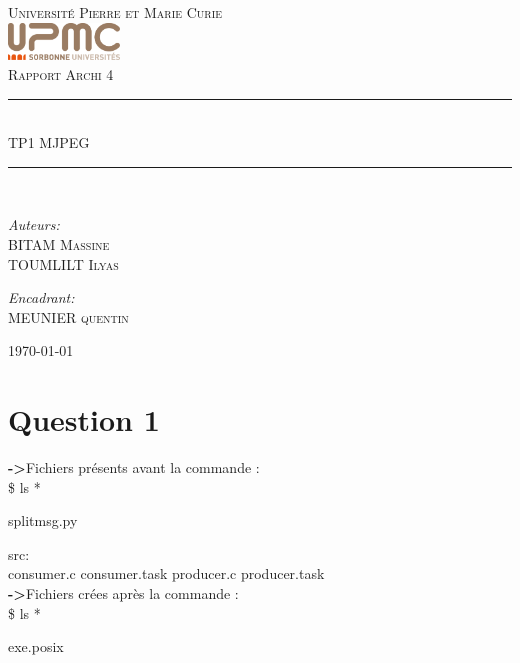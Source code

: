 \documentclass[12pt]{article}
\newcommand{\HRule}{\rule{\linewidth}{0.5mm}}
\begin{document}
\begin{titlepage}
  \begin{center}
    \textsc{\LARGE Université Pierre et Marie Curie}\\[1.5cm]
    \includegraphics[height=1cm]{upmc.png}\\[1.5cm]
    \textsc{\Large Rapport Archi 4 }\\[2cm]
    \HRule \\[1cm]
    \textsc{\huge TP1 MJPEG }\\[0.5cm]
    \HRule \\[1cm]
    \noindent
    \begin{minipage}[t]{0.55\textwidth}
      \begin{flushleft} \large
        \emph{Auteurs:}\\
        BITAM \textsc{Massine}\\
        TOUMLILT \textsc{Ilyas}
      \end{flushleft}
    \end{minipage}%
    \begin{minipage}[t]{0.47\textwidth}
      \begin{flushright} \large
        \emph{Encadrant:} \\
        MEUNIER \textsc{quentin}
      \end{flushright}
    \end{minipage}
    \vfill
    {\large \today}
  \end{center}
\end{titlepage}

\section*{Question 1}

\textbf{->}Fichiers présents avant la commande :\\
\$ ls *

splitmsg.py

src:\\
consumer.c  consumer.task  producer.c  producer.task\\

\textbf{->}Fichiers crées après la commande :\\
\$ ls *

exe.posix\\
\end{document}
